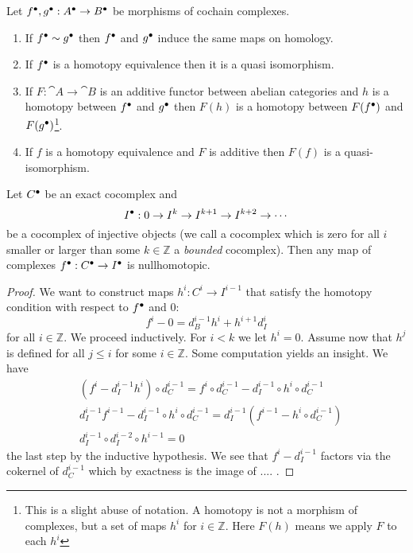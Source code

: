 \begin{exc}\label{exc:properties-of-homotopy}
	Let ${f}^\bullet, {g}^\bullet: {A}^\bullet \to {B}^\bullet$ be morphisms of cochain complexes. 
	\begin{enumerate}[label=(\alph*)]
    	\item If ${f}^\bullet \sim {g}^\bullet$ then ${f}^\bullet$ and ${g}^\bullet$ induce the same maps on homology. 
		\item If ${f}^\bullet$ is a homotopy equivalence then it is a quasi isomorphism.
		\item If $F: \cat A \to \cat B$ is an additive functor between abelian categories and $h$ is a homotopy between ${f}^\bullet$ and ${g}^\bullet$ then $F(h)$ is a homotopy between $F({f}^\bullet)$ and $F({g}^\bullet)$\footnote{This is a slight abuse of notation. A homotopy is not a morphism of complexes, but a set of maps $h^i$ for $i \in \mathbb{Z}$. Here $F(h)$ means we apply $F$ to each $h^i$}.
		\item If $f$ is a homotopy equivalence and $F$ is additive then $F(f)$ is a quasi-isomorphism. 
    \end{enumerate}
\end{exc}

\begin{lem}\label{lem:maps-from-exact-to-injective-nullhomotopic}
	Let ${C}^\bullet$ be an exact cocomplex and \[
    	{I}^\bullet: 0 \to I^k \to I^{k+1} \to I^{k+2} \to \cdots 
    \] be a cocomplex of injective objects (we call a cocomplex which is zero for all $i$ smaller or larger than some $k \in \mathbb{Z}$ a \emph{bounded} cocomplex). 
	Then any map of complexes ${f}^\bullet: {C}^\bullet \to {I}^\bullet$ is nullhomotopic. 
\end{lem}
\begin{proof}
	We want to construct maps $h^i: C^i \to I^{i-1}$ that satisfy the homotopy condition with respect to ${f}^\bullet$ and $0$: \[
    	f^i - 0 = d_B^{i-1}h^i + h^{i+1}d_I^i
    \] for all $i \in \mathbb{Z}$. We proceed inductively. For $i < k$ we let $h^i = 0$. Assume now that $h^j$ is defined for all $j \leq i$ for some $i \in \mathbb{Z}$. 
	Some computation yields an insight. We have 
	\begin{align*}
    	&(f^i - d_I^{i-1}h^i) \circ d_C^{i-1} = f^i \circ d_C^{i-1} - d_I ^{i-1} \circ h^i \circ d_C^{i-1}\\
		& d_I^{i-1}f^{i-1} - d_I^{i-1}\circ h^i \circ d_C^{i-1} = d_I^{i-1}(f^{i-1} - h^i \circ d_C^{i-1})\\
		& d^{i-1}_I \circ d_I^{i-2} \circ h^{i-1} = 0
    \end{align*} the last step by the inductive hypothesis. 
	We see that $f^i - d_I^{i-1}$ factors via the cokernel of $d_C^{i-1}$ which by exactness is the image of .... . 
\end{proof}

